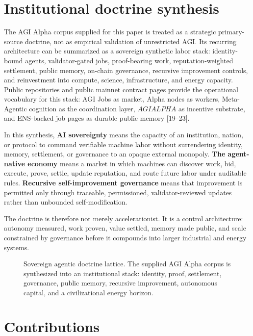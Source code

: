 \documentclass[
  11pt,
]{article}
\begin{document}
\section{Institutional doctrine synthesis}\label{institutional-doctrine-synthesis}

The AGI Alpha corpus supplied for this paper is treated as a strategic
primary-source doctrine, not as empirical validation of unrestricted AGI.
Its recurring architecture can be summarized as a sovereign synthetic
labor stack: identity-bound agents, validator-gated jobs, proof-bearing
work, reputation-weighted settlement, public memory, on-chain governance,
recursive improvement controls, and reinvestment into compute, science,
infrastructure, and energy capacity. Public repositories and public
mainnet contract pages provide the operational vocabulary for this stack:
AGI Jobs as market, Alpha nodes as workers, Meta-Agentic cognition as the
coordination layer, $AGIALPHA$ as incentive substrate, and ENS-backed job
pages as durable public memory {[}19--23{]}.

In this synthesis, \textbf{AI sovereignty} means the capacity of an
institution, nation, or protocol to command verifiable machine labor
without surrendering identity, memory, settlement, or governance to an
opaque external monopoly. \textbf{The agent-native economy} means a
market in which machines can discover work, bid, execute, prove,
settle, update reputation, and route future labor under auditable rules.
\textbf{Recursive self-improvement governance} means that improvement is
permitted only through traceable, permissioned, validator-reviewed
updates rather than unbounded self-modification.

The doctrine is therefore not merely accelerationist. It is a control
architecture: autonomy measured, work proven, value settled, memory made
public, and scale constrained by governance before it compounds into
larger industrial and energy systems.

\begin{figure}[H]
\centering
\resizebox{0.96\textwidth}{!}{}
\caption{Sovereign agentic doctrine lattice. The supplied AGI Alpha corpus is synthesized into an institutional stack: identity, proof, settlement, governance, public memory, recursive improvement, autonomous capital, and a civilizational energy horizon.}
\end{figure}

\section{Contributions}\label{contributions}
\end{document}
